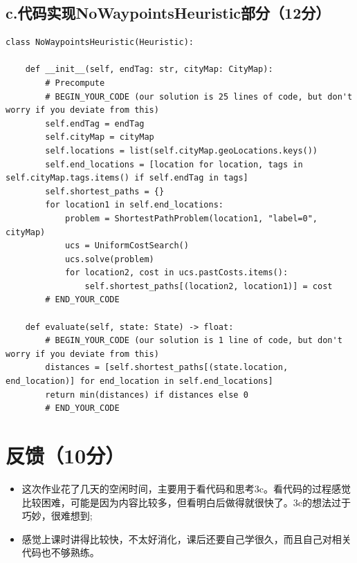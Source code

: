 \documentclass{article}
\begin{document}
\subsection*{c.代码实现NoWaypointsHeuristic部分（12分）}
\begin{lstlisting}
class NoWaypointsHeuristic(Heuristic):
    
    def __init__(self, endTag: str, cityMap: CityMap):
        # Precompute
        # BEGIN_YOUR_CODE (our solution is 25 lines of code, but don't worry if you deviate from this)
        self.endTag = endTag
        self.cityMap = cityMap
        self.locations = list(self.cityMap.geoLocations.keys())
        self.end_locations = [location for location, tags in self.cityMap.tags.items() if self.endTag in tags]
        self.shortest_paths = {}
        for location1 in self.end_locations:
            problem = ShortestPathProblem(location1, "label=0", cityMap)
            ucs = UniformCostSearch()
            ucs.solve(problem)
            for location2, cost in ucs.pastCosts.items():
                self.shortest_paths[(location2, location1)] = cost
        # END_YOUR_CODE

    def evaluate(self, state: State) -> float:
        # BEGIN_YOUR_CODE (our solution is 1 line of code, but don't worry if you deviate from this)
        distances = [self.shortest_paths[(state.location, end_location)] for end_location in self.end_locations]
        return min(distances) if distances else 0
        # END_YOUR_CODE
\end{lstlisting}


\section*{反馈（10分）}

\begin{itemize}
    \item 这次作业花了几天的空闲时间，主要用于看代码和思考3c。看代码的过程感觉比较困难，可能是因为内容比较多，但看明白后做得就很快了。3c的想法过于巧妙，很难想到;
    \item 感觉上课时讲得比较快，不太好消化，课后还要自己学很久，而且自己对相关代码也不够熟练。
\end{itemize}
\end{document}

